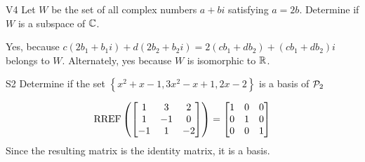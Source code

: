\documentclass{sbgLAquiz}
\begin{document}
\begin{problem}{V4} Let \(W\) be the set of all complex numbers \(a+bi\)
satisfying  \(a=2b\).
Determine if \(W\) is a subspace of \(\IC\).
\end{problem}
\begin{solution}
Yes, because \(c(2b_1+b_1i)+d(2b_2+b_2i)=2(cb_1+db_2)+(cb_1+db_2)i\) belongs to
\(W\). Alternately, yes because \(W\) is isomorphic to \(\IR\).
\end{solution}
\begin{extract}\newpage\end{extract}
\begin{problem}{S2}
Determine if the set $\left\{ x^2+x-1, 3x^2-x+1, 2x-2 \right\}$ is a basis of $\P_2$
\end{problem}
\begin{solution}
$$\RREF\left(\begin{bmatrix} 1 & 3 & 2 \\ 1 & -1 & 0 \\ -1 & 1 & -2 \end{bmatrix} \right)= \begin{bmatrix} 1 & 0 &0 \\ 0 & 1 & 0 \\ 0 & 0 & 1\end{bmatrix}$$
Since the resulting matrix is the identity matrix, it is a basis.
\end{solution}
\end{document}
